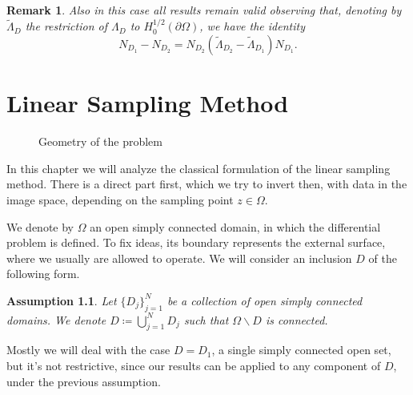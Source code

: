 \documentclass[10pt, a4paper, twoside, openright]{book}
\theoremstyle{definition}
\theoremstyle{plain}
\theoremstyle{plain}
\theoremstyle{plain}
\theoremstyle{plain}
\newtheorem{remark}[subsection]{Remark}
\theoremstyle{plain}
\theoremstyle{plain}
\theoremstyle{plain}
\newtheorem{assumption}[subsection]{Assumption}
\theoremstyle{plain}
\begin{document}
\begin{remark}
Also in this case all results remain valid observing  that, denoting by $\tilde\Lambda_D$ the restriction of 
$\Lambda_D$ to $H_0^{1/2}(\partial\Omega)$, we have the identity
$$N_{D_1}-N_{D_2}=N_{D_2}(\tilde\Lambda_{D_2}-\tilde\Lambda_{D_1})N_{D_1}.$$
\end{remark}


\chapter{Linear Sampling Method}
\label{ch:linear-sampling}

\begin{figure}[tb]
\begin{center}
\end{center}
\caption{Geometry of the problem}
\end{figure}

In this chapter we will analyze the classical formulation of the linear sampling method. 
There is a direct part first, which we try to invert then, with data in the image space, 
depending on the sampling point $z\in\Omega$.
\par
We denote by $\Omega$ an open simply connected domain, in which the differential problem is defined.
To fix ideas, its boundary represents the external surface, where we usually are allowed to operate.
We will consider an inclusion $D$ of the following form.
\begin{assumption}
\label{assumption:connected}
 Let $\bigl\{D_j\bigr\}_{j=1}^N$ be a collection of open simply connected domains.
 We denote $D\coloneqq\bigcup_{j=1}^ND_j$ such that $\Omega\backslash D$ is connected.
\end{assumption}
Mostly we will deal with the case $D=D_1$, a single simply connected open set, but it's not restrictive, 
since our results can be applied to any component of $D$, under the previous assumption.
\end{document}
